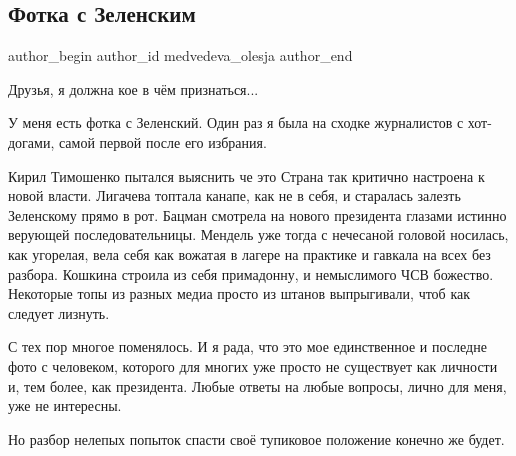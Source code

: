  
 
 
 
 
 
\subsection{Фотка с Зеленским}
\label{sec:26_11_2021.fb.medvedeva_olesja.1.fotka_s_zelenskim}
 
\ifcmt
 author_begin
   author_id medvedeva_olesja
 author_end
\fi

Друзья, я должна кое в чём признаться...

У меня есть фотка с Зеленский. Один раз я была на сходке журналистов с
хот-догами, самой первой после его избрания.

Кирил Тимошенко пытался выяснить че это Страна так критично настроена к новой
власти. Лигачева топтала канапе, как не в себя, и старалась залезть Зеленскому
прямо в рот. Бацман смотрела на нового президента глазами истинно верующей
последовательницы. Мендель уже тогда с нечесаной головой носилась, как
угорелая, вела себя как вожатая в лагере на практике и гавкала на всех без
разбора. Кошкина строила из себя примадонну, и немыслимого ЧСВ божество.
Некоторые топы из разных медиа просто из штанов выпрыгивали, чтоб как следует
лизнуть. 

С тех пор многое поменялось. И я рада, что это мое единственное и последне фото
с человеком, которого для многих уже просто не существует как личности и, тем
более, как президента. Любые ответы на любые вопросы, лично для меня, уже не
интересны. 

Но разбор нелепых попыток спасти своё  тупиковое положение конечно же будет.

